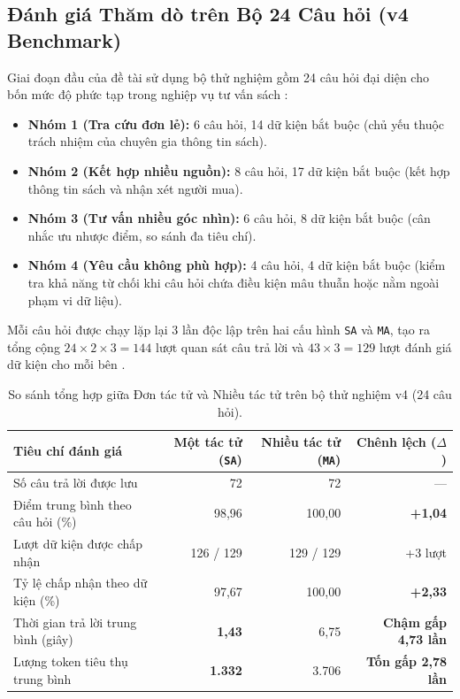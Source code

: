 \subsection{Đánh giá Thăm dò trên Bộ 24 Câu hỏi (v4 Benchmark)}
Giai đoạn đầu của đề tài sử dụng bộ thử nghiệm gồm 24 câu hỏi đại diện cho bốn mức độ phức tạp trong nghiệp vụ tư vấn sách :
\begin{itemize}
    \item \textbf{Nhóm 1 (Tra cứu đơn lẻ):} 6 câu hỏi, 14 dữ kiện bắt buộc (chủ yếu thuộc trách nhiệm của chuyên gia thông tin sách).
    \item \textbf{Nhóm 2 (Kết hợp nhiều nguồn):} 8 câu hỏi, 17 dữ kiện bắt buộc (kết hợp thông tin sách và nhận xét người mua).
    \item \textbf{Nhóm 3 (Tư vấn nhiều góc nhìn):} 6 câu hỏi, 8 dữ kiện bắt buộc (cân nhắc ưu nhược điểm, so sánh đa tiêu chí).
    \item \textbf{Nhóm 4 (Yêu cầu không phù hợp):} 4 câu hỏi, 4 dữ kiện bắt buộc (kiểm tra khả năng từ chối khi câu hỏi chứa điều kiện mâu thuẫn hoặc nằm ngoài phạm vi dữ liệu).
\end{itemize}

Mỗi câu hỏi được chạy lặp lại 3 lần độc lập trên hai cấu hình \texttt{SA} và \texttt{MA}, tạo ra tổng cộng $24 \times 2 \times 3 = 144$ lượt quan sát câu trả lời và $43 \times 3 = 129$ lượt đánh giá dữ kiện cho mỗi bên .

\begin{table}[htbp]\small
\caption{So sánh tổng hợp giữa Đơn tác tử và Nhiều tác tử trên bộ thử nghiệm v4 (24 câu hỏi).}
\label{tab:v4_results}
\begin{tabularx}{\linewidth}{Yrrr}\toprule
Tiêu chí đánh giá & Một tác tử (\texttt{SA}) & Nhiều tác tử (\texttt{MA}) & Chênh lệch ($\Delta$)\\\midrule
Số câu trả lời được lưu & 72 & 72 & ---\\
Điểm trung bình theo câu hỏi (\%) & 98,96 & 100,00 & \textbf{+1,04}\\
Lượt dữ kiện được chấp nhận & 126 / 129 & 129 / 129 & +3 lượt\\
Tỷ lệ chấp nhận theo dữ kiện (\%) & 97,67 & 100,00 & \textbf{+2,33}\\
Thời gian trả lời trung bình (giây) & \textbf{1,43} & 6,75 & \textbf{Chậm gấp 4,73 lần}\\
Lượng token tiêu thụ trung bình & \textbf{1.332} & 3.706 & \textbf{Tốn gấp 2,78 lần}\\\bottomrule
\end{tabularx}
\end{table}


